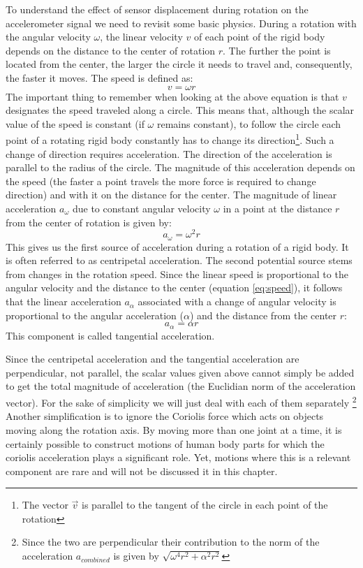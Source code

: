 To understand the effect of sensor displacement during rotation on the
accelerometer signal we
need to revisit some basic physics.
During a rotation with the  angular velocity $\omega$, 
the linear velocity $v$ of each point of the rigid
body depends on the distance to the center of
rotation $r$. The further the point is located from the center, the larger the
circle it needs to travel and, consequently, the faster it moves. The speed is defined as: 
\begin{equation}
\label{eq:speed}
v=\omega r
\end{equation}
The important thing to remember when looking at the above equation is
that $v$ designates the speed traveled along a circle. This means
that, although the scalar value of the speed is constant (if $\omega$
remains constant), to follow the circle each point of a rotating
rigid body constantly has to change its direction\footnote{The
  vector $\vec{v}$ is parallel to the tangent of the circle in each point
of the rotation}.  Such a change of
direction requires acceleration. The direction of the acceleration
is parallel to the radius of the circle. The magnitude of this
acceleration depends on the
speed (the faster a point travels the more force is required to change
direction) and with it on the distance for the center.  The magnitude
of 
linear acceleration $a_{\omega}$ due to constant angular velocity  $\omega$  in a point at the distance $r$ from the center of
rotation is given by: 
\begin{equation}
\label{eq:centrifugalx}
a_{\omega}=\omega^2r
\end{equation}
This gives
us the first source of acceleration  during a rotation of a
rigid body. It is often referred to as centripetal acceleration.
The second potential source stems from changes in the
rotation speed. Since the linear speed is proportional to the angular
velocity and the distance to the center (equation \ref{eq:speed}),
it follows that the linear acceleration $a_{\alpha}$ associated with a change of
angular velocity is proportional to the angular acceleration
($\alpha$) and the distance from the center $r$: 
\begin{equation}
\label{eq:tangential}
a_{\alpha}=\alpha r
\end{equation} 
This component is called tangential acceleration. 

Since the centripetal acceleration and the tangential
acceleration are perpendicular, not parallel, the scalar 
values given above cannot simply be added to get 
the total magnitude of acceleration (the Euclidian norm of
the acceleration vector).  For the sake of simplicity we will just
deal with each of them separately \footnote{Since the two are
  perpendicular their contribution to the norm of the acceleration
  $a_{combined}$ is given by $\sqrt{\omega^4r^2+\alpha^2 r^2}$}
Another simplification is to ignore the Coriolis 
force which acts on objects  moving along the rotation axis. 
By moving more than one joint at a time, it is certainly possible to construct 
motions of human body parts for which the coriolis acceleration plays a 
significant role. Yet, motions where this is a relevant component are
rare and will not be discussed it in this chapter.

